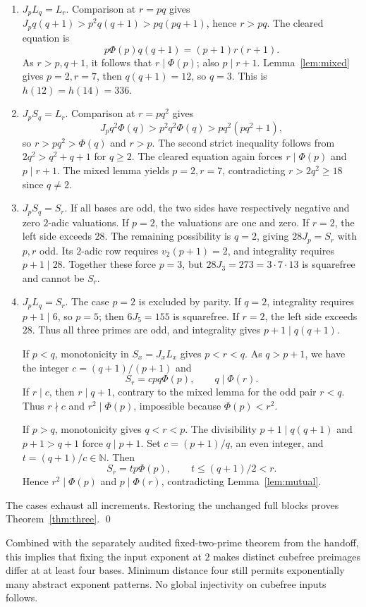 \documentclass[11pt,a4paper]{article}
\theoremstyle{remark}
\newcommand{\NN}{\mathbb N}
\begin{document}
\begin{enumerate}[label=\arabic*.]
\item $J_pL_q=L_r$. Comparison at $r=pq$ gives
$J_pq(q+1)>p^2q(q+1)>pq(pq+1)$, hence $r>pq$.
The cleared equation is
\[
 p\Phi(p)q(q+1)=(p+1)r(r+1).
\]
As $r>p,q+1$, it follows that $r\mid\Phi(p)$; also $p\mid r+1$.
Lemma~\ref{lem:mixed} gives $p=2,r=7$, then $q(q+1)=12$, so $q=3$.
This is $h(12)=h(14)=336$.

\item $J_pS_q=L_r$. Comparison at $r=pq^2$ gives
\[
 J_pq^2\Phi(q)>p^2q^2\Phi(q)>pq^2(pq^2+1),
\]
so $r>pq^2>\Phi(q)$ and $r>p$. The second strict inequality follows
from $2q^2>q^2+q+1$ for $q\ge2$.
The cleared equation again forces $r\mid\Phi(p)$ and $p\mid r+1$.
The mixed lemma yields $p=2,r=7$, contradicting $r>2q^2\ge18$ since
$q\ne2$.

\item $J_pS_q=S_r$. If all bases are odd, the two sides have respectively
negative and zero $2$-adic valuations. If $p=2$, the valuations are one
and zero. If $r=2$, the left side exceeds $28$. The remaining possibility
is $q=2$, giving $28J_p=S_r$ with $p,r$ odd. Its $2$-adic row requires
$v_2(p+1)=2$, and integrality requires $p+1\mid28$. Together these force
$p=3$, but $28J_3=273=3\cdot7\cdot13$ is squarefree and cannot be $S_r$.

\item $J_pL_q=S_r$. The case $p=2$ is excluded by parity. If $q=2$,
integrality requires $p+1\mid6$, so $p=5$; then $6J_5=155$ is squarefree.
If $r=2$, the left side exceeds $28$. Thus all three primes are odd, and
integrality gives $p+1\mid q(q+1)$.

If $p<q$, monotonicity in $S_x=J_xL_x$ gives $p<r<q$. As $q>p+1$,
we have the integer $c=(q+1)/(p+1)$ and
\[
 S_r=cpq\Phi(p),\qquad q\mid\Phi(r).
\]
If $r\mid c$, then $r\mid q+1$, contrary to the mixed lemma for the
odd pair $r<q$. Thus $r\nmid c$ and $r^2\mid\Phi(p)$, impossible
because $\Phi(p)<r^2$.

If $p>q$, monotonicity gives $q<r<p$. The divisibility
$p+1\mid q(q+1)$ and $p+1>q+1$ force $q\mid p+1$. Set
$c=(p+1)/q$, an even integer, and $t=(q+1)/c\in\NN$. Then
\[
 S_r=tp\Phi(p),\qquad t\le(q+1)/2<r.
\]
Hence $r^2\mid\Phi(p)$ and $p\mid\Phi(r)$, contradicting
Lemma~\ref{lem:mutual}.
\end{enumerate}
The cases exhaust all increments. Restoring the unchanged full blocks proves
Theorem~\ref{thm:three}. \qed

Combined with the separately audited fixed-two-prime theorem from the handoff,
this implies that fixing the input exponent at $2$ makes distinct cubefree
preimages differ at at least four bases. Minimum distance four still permits
exponentially many abstract exponent patterns. No global injectivity on
cubefree inputs follows.
\end{document}
